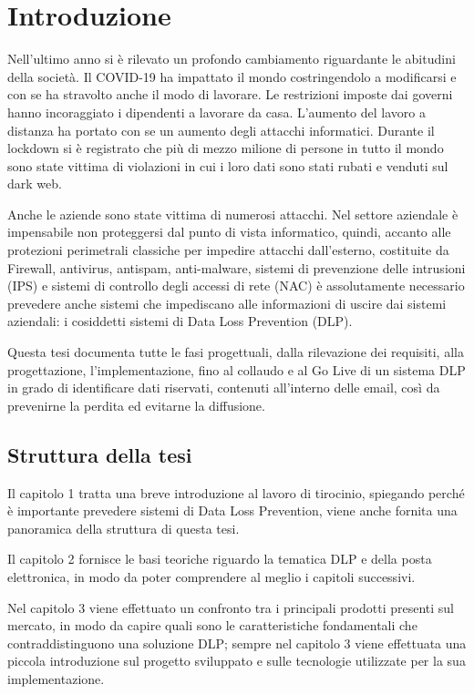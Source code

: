 \chapter{Introduzione}

Nell'ultimo anno si è rilevato un profondo cambiamento riguardante le abitudini della società.
Il COVID-19 ha impattato il mondo costringendolo a modificarsi e con se ha stravolto anche il modo di lavorare. 
Le restrizioni imposte dai governi hanno incoraggiato i dipendenti a lavorare da casa.
L'aumento del lavoro a distanza ha portato con se un aumento degli attacchi informatici. 
Durante il lockdown si è registrato che più di mezzo milione di persone in tutto il mondo sono state 
vittima di violazioni in cui i loro dati sono stati rubati e venduti sul dark web.\cite{Intro}

Anche le aziende sono state vittima di numerosi attacchi. Nel settore aziendale è impensabile 
non proteggersi dal punto di vista informatico, quindi, accanto alle protezioni perimetrali classiche 
per impedire attacchi dall’esterno, costituite da Firewall, antivirus, antispam, anti-malware, 
sistemi di prevenzione delle intrusioni (IPS) e sistemi di controllo degli accessi di rete (NAC) 
è assolutamente necessario prevedere anche sistemi che impediscano alle informazioni di uscire 
dai sistemi aziendali: i cosiddetti sistemi di Data Loss Prevention (DLP).

Questa tesi documenta tutte le fasi progettuali, dalla rilevazione dei requisiti, alla progettazione, 
l’implementazione, fino al collaudo e al Go Live di un sistema DLP in grado di identificare dati riservati, 
contenuti all'interno delle email, così da prevenirne la perdita ed evitarne la diffusione.

\section{Struttura della tesi}

Il capitolo 1 tratta una breve introduzione al lavoro di tirocinio, 
spiegando perché è importante prevedere sistemi di Data Loss Prevention, 
viene anche fornita una panoramica della struttura di questa tesi.

Il capitolo 2 fornisce le basi teoriche riguardo la tematica DLP e 
della posta elettronica, in modo da poter comprendere al meglio i capitoli successivi.

Nel capitolo 3 viene effettuato un confronto tra i principali prodotti presenti sul mercato, 
in modo da capire quali sono le caratteristiche fondamentali che contraddistinguono una soluzione DLP; 
sempre nel capitolo 3 viene effettuata una piccola introduzione sul progetto sviluppato e sulle tecnologie 
utilizzate per la sua implementazione.

